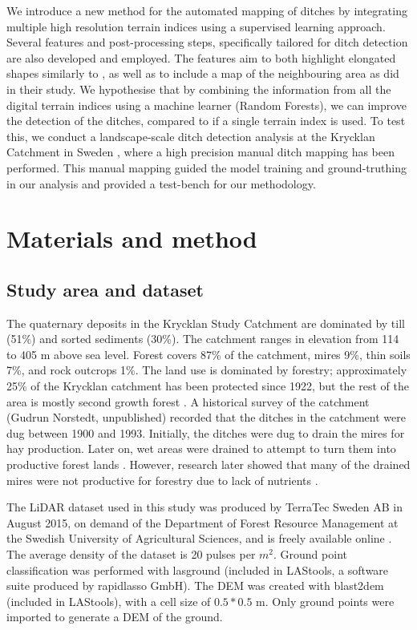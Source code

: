 \documentclass[11pt, review]{elsarticle} %
\begin{document}
We introduce a new method for the automated mapping of ditches by integrating multiple high resolution terrain indices using a supervised learning approach. Several features and post-processing steps, specifically tailored for ditch detection are also developed and employed. The features aim to both highlight elongated shapes similarly to \citet{cazorzi}, as well as to include a map of the neighbouring area as \citet{roelens} did in their study. We hypothesise that by combining the information from all the digital terrain indices using a machine learner (Random Forests), we can improve the detection of the ditches, compared to if a single terrain index is used. To test this, we conduct a landscape-scale ditch detection analysis at the Krycklan Catchment in Sweden \citep{krycklancatchment}, where a high precision manual ditch mapping has been performed. This manual mapping guided the model training and ground-truthing in our analysis and provided a test-bench for our methodology.

\section{Materials and method}
\label{method}

\subsection{Study area and dataset}
The quaternary deposits in the Krycklan Study Catchment are dominated by till (51\%) and sorted sediments (30\%). The catchment ranges in elevation from 114 to 405 m above sea level. Forest covers 87\% of the catchment, mires 9\%, thin soils 7\%, and rock outcrops 1\%. The land use is dominated by forestry; approximately 25\% of the Krycklan catchment has been protected since 1922, but  the rest of the area is mostly second growth forest \citep{krycklancatchment}.  A historical survey of the catchment (Gudrun Norstedt, unpublished) recorded  that the ditches in the catchment were dug between 1900 and 1993. Initially, the ditches were dug to drain the mires for hay production. Later on, wet areas were drained to attempt to turn them into productive forest lands \citep{paivanen}. However, research later showed that many of the drained mires were not productive for forestry due to lack of nutrients \citep{sikstrom}.

The LiDAR dataset used in this study was produced by TerraTec Sweden AB in August 2015, on demand of the Department of Forest Resource Management at the Swedish University of Agricultural Sciences, and is freely available online \citep{dataset_raw}. The average density of the dataset is 20 pulses per $m^2$. Ground point classification was performed with lasground (included in LAStools, a software suite produced by rapidlasso GmbH). The DEM was created with blast2dem (included in LAStools), with a cell size of $0.5*0.5$ m. Only ground points were imported to generate a DEM of the ground.
\end{document}
